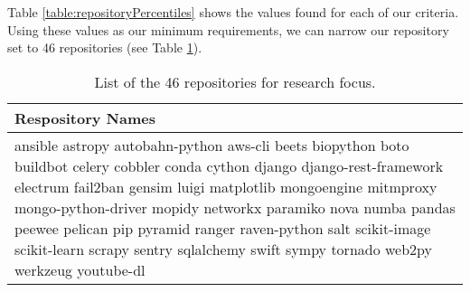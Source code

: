 Table \ref{table:repositoryPercentiles} shows the values found for each of our criteria. Using these values as our minimum requirements, we can narrow our repository set to 46 repositories (see Table \ref{table:repositorySet}).

\begin{table}[ht]
  \centering
  \begin{tabularx}{1.0\textwidth} {
    | >{\centering\arraybackslash}X |
  }
    \hline
      Respository Names \\ 
    \hline\hline
      ansible
      astropy
      autobahn-python
      aws-cli
      beets
      biopython
      boto
      buildbot
      celery
      cobbler
      conda
      cython
      django
      django-rest-framework
      electrum
      fail2ban
      gensim
      luigi
      matplotlib
      mongoengine
      mitmproxy
      mongo-python-driver
      mopidy
      networkx
      paramiko
      nova
      numba
      pandas
      peewee
      pelican
      pip
      pyramid
      ranger
      raven-python
      salt
      scikit-image
      scikit-learn
      scrapy
      sentry
      sqlalchemy
      swift
      sympy
      tornado
      web2py
      werkzeug
      youtube-dl \\
    \hline
  \end{tabularx}
  \caption{List of the 46 repositories for research focus.}
  \label{table:repositorySet}
\end{table}
